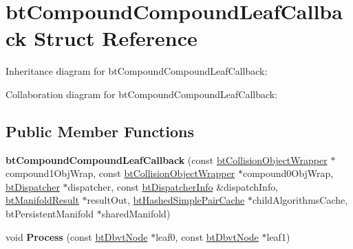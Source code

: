 \hypertarget{structbt_compound_compound_leaf_callback}{\section{bt\+Compound\+Compound\+Leaf\+Callback Struct Reference}
\label{structbt_compound_compound_leaf_callback}
}


Inheritance diagram for bt\+Compound\+Compound\+Leaf\+Callback\+:


Collaboration diagram for bt\+Compound\+Compound\+Leaf\+Callback\+:
\subsection*{Public Member Functions}
\begin{DoxyCompactItemize}
\item 
\hypertarget{structbt_compound_compound_leaf_callback_a7b7baaf45271219f64c915884152d7e0}{{\bfseries bt\+Compound\+Compound\+Leaf\+Callback} (const \hyperlink{structbt_collision_object_wrapper}{bt\+Collision\+Object\+Wrapper} $\ast$compound1\+Obj\+Wrap, const \hyperlink{structbt_collision_object_wrapper}{bt\+Collision\+Object\+Wrapper} $\ast$compound0\+Obj\+Wrap, \hyperlink{classbt_dispatcher}{bt\+Dispatcher} $\ast$dispatcher, const \hyperlink{structbt_dispatcher_info}{bt\+Dispatcher\+Info} \&dispatch\+Info, \hyperlink{classbt_manifold_result}{bt\+Manifold\+Result} $\ast$result\+Out, \hyperlink{classbt_hashed_simple_pair_cache}{bt\+Hashed\+Simple\+Pair\+Cache} $\ast$child\+Algorithms\+Cache, bt\+Persistent\+Manifold $\ast$shared\+Manifold)}\label{structbt_compound_compound_leaf_callback_a7b7baaf45271219f64c915884152d7e0}

\item 
\hypertarget{structbt_compound_compound_leaf_callback_a1668e5131b842bebe80e75fb51a251b9}{void {\bfseries Process} (const \hyperlink{structbt_dbvt_node}{bt\+Dbvt\+Node} $\ast$leaf0, const \hyperlink{structbt_dbvt_node}{bt\+Dbvt\+Node} $\ast$leaf1)}\label{structbt_compound_compound_leaf_callback_a1668e5131b842bebe80e75fb51a251b9}

\end{DoxyCompactItemize}
